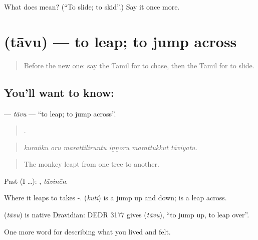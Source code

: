 \begin{tcolorbox}[breakable,colback=teal!4,colframe=teal!35!black,title={Before you move on}]
What does  mean? (\textquotedblleft{}To slide; to skid\textquotedblright{}.) Say it once more.
\end{tcolorbox}
\section[\texorpdfstring{\ta{தாவு} (tāvu)}{தாவு (tāvu)}]{ (tāvu) — to leap; to jump across}

\label{lesson:TA-C533-tavu}



\begin{quote}
Before the new one: say the Tamil for to chase, then the Tamil for to slide.
\end{quote}

\subsection*{You'll want to know: }
\textbf{} — \emph{tāvu} — \textquotedblleft{}to leap; to jump across\textquotedblright{}.

\begin{quote}
     .
\end{quote}

\begin{quote}
\emph{kuraṅku oru marattiliruntu iṉṉoru marattukkut tāviyatu.}
\end{quote}

\begin{quote}
The monkey leapt from one tree to another.
\end{quote}

Past (I …): , \emph{tāviṉēṉ}.

Where it leaps to takes -.  (\emph{kuti}) is a jump up and down;  is a leap across.

\begin{cousinweb}
\textbf{} (\emph{tāvu}) is native Dravidian: DEDR 3177 gives  (\emph{tāvu}), \textquotedblleft{}to jump up, to leap over\textquotedblright{}.
\end{cousinweb}

\begin{grammarlens}[title={What you've built}]
One more word for describing what you lived and felt.
\end{grammarlens}

